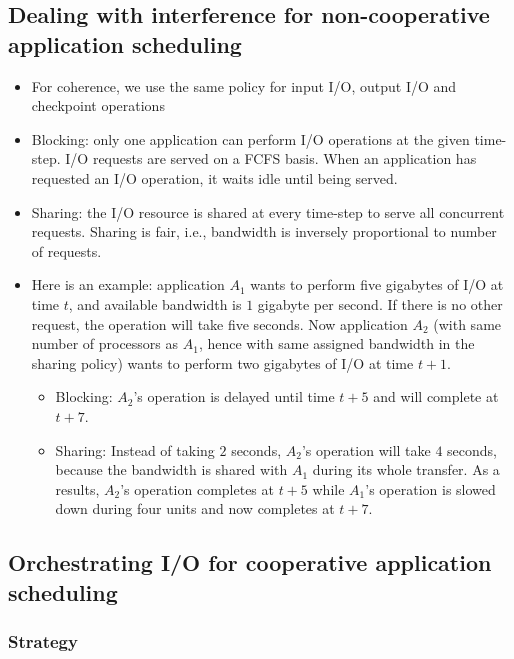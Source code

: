 \documentclass[conference]{IEEEtran}
\begin{document}
\subsection{Dealing with interference for non-cooperative application scheduling}
\begin{itemize}
  \item For coherence, we use the same policy for input I/O, output I/O and checkpoint operations 
  \item Blocking: only one application can perform I/O operations at the given time-step.
  I/O requests are served on a FCFS basis. When an application has requested an I/O operation, it waits idle until being served.
  \item Sharing: the I/O resource is shared at every time-step to serve all concurrent requests. Sharing is fair, i.e., bandwidth is inversely proportional to number of requests.
  \item Here is an example:
  application $A_{1}$ wants to perform five gigabytes of I/O at time $t$,
  and available bandwidth is
  $1$ gigabyte per second. If there is no other request, the operation will take five seconds.
  Now application $A_{2}$ (with same number of processors as $A_{1}$, hence with same assigned bandwidth in the sharing policy) wants to perform two gigabytes of I/O at time $t+1$.
  \begin{itemize}
  \item Blocking: $A_{2}$'s operation is delayed until time $t+5$ and will complete at $t+7$.
  \item Sharing: Instead of taking $2$ seconds, $A_{2}$'s operation will take $4$ seconds, because the bandwidth is shared with $A_{1}$ during its whole transfer. As a results, $A_{2}$'s operation completes at $t+5$ while $A_{1}$'s  operation is slowed down during four units and now completes at $t+7$.
  \end{itemize}
\end{itemize}

\subsection{Orchestrating I/O for cooperative application scheduling}

\subsubsection{Strategy}
\end{document}
